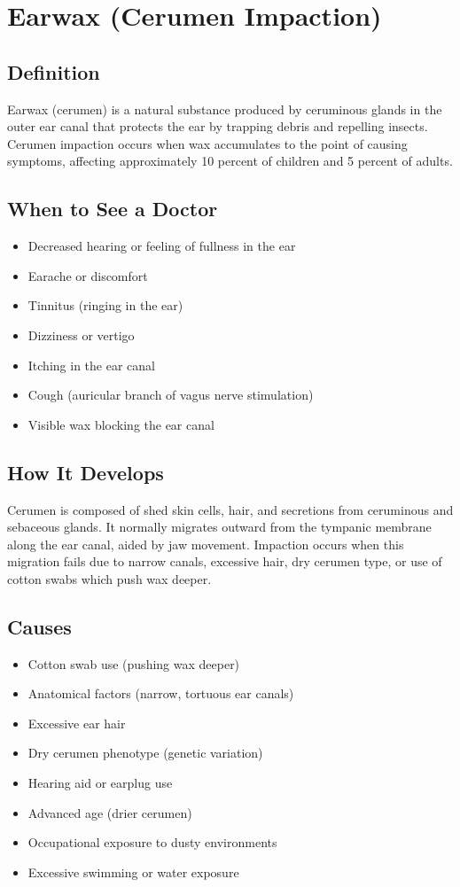 \chapter{Earwax (Cerumen Impaction)}

\section*{Definition}
Earwax (cerumen) is a natural substance produced by ceruminous glands in the outer ear canal that protects the ear by trapping debris and repelling insects. Cerumen impaction occurs when wax accumulates to the point of causing symptoms, affecting approximately 10 percent of children and 5 percent of adults.

\section*{When to See a Doctor}
\begin{itemize}
\item Decreased hearing or feeling of fullness in the ear
\item Earache or discomfort
\item Tinnitus (ringing in the ear)
\item Dizziness or vertigo
\item Itching in the ear canal
\item Cough (auricular branch of vagus nerve stimulation)
\item Visible wax blocking the ear canal
\end{itemize}

\section*{How It Develops}
Cerumen is composed of shed skin cells, hair, and secretions from ceruminous and sebaceous glands. It normally migrates outward from the tympanic membrane along the ear canal, aided by jaw movement. Impaction occurs when this migration fails due to narrow canals, excessive hair, dry cerumen type, or use of cotton swabs which push wax deeper.

\section*{Causes}
\begin{itemize}
\item Cotton swab use (pushing wax deeper)
\item Anatomical factors (narrow, tortuous ear canals)
\item Excessive ear hair
\item Dry cerumen phenotype (genetic variation)
\item Hearing aid or earplug use
\item Advanced age (drier cerumen)
\item Occupational exposure to dusty environments
\item Excessive swimming or water exposure
\end{itemize}

